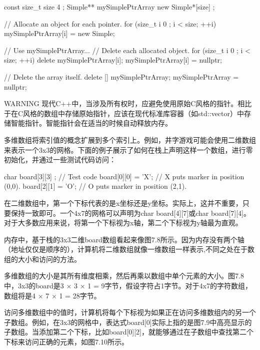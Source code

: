 \begin{cpp}
const size_t size { 4 };
Simple** mySimplePtrArray { new Simple*[size] };

// Allocate an object for each pointer.
for (size_t i { 0 }; i < size; ++i) { mySimplePtrArray[i] = new Simple{}; }

// Use mySimplePtrArray...
// Delete each allocated object.
for (size_t i { 0 }; i < size; ++i) {
    delete mySimplePtrArray[i];
    mySimplePtrArray[i] = nullptr;
}

// Delete the array itself.
delete [] mySimplePtrArray;
mySimplePtrArray = nullptr;
\end{cpp}

\begin{myWarning}{WARNING}
现代C++中，当涉及所有权时，应避免使用原始C风格的指针。相比于在C风格的数组中存储原始指针，应该在现代标准库容器（如std::vector）中存储智能指针。智能指针会在适当的时候自动释放内存。
\end{myWarning}


多维数组将索引值的概念扩展到多个索引上。例如，井字游戏可能会使用二维数组来表示一个3x3的网格。下面的例子展示了如何在栈上声明这样一个数组，进行零初始化，并通过一些测试代码访问：

\begin{cpp}
char board[3][3] {};
// Test code
board[0][0] = 'X'; // X puts marker in position (0,0).
board[2][1] = 'O'; // O puts marker in position (2,1).
\end{cpp}

在二维数组中，第一个下标代表的是x坐标还是y坐标。实际上，这并不重要，只要保持一致即可。一个4x7的网格可以声明为char board[4][7]或char board[7][4]。对于大多数应用来说，将第一个下标视为x轴，第二个下标视为y轴最为直观。


内存中，基于栈的3x3二维board数组看起来像图7.8所示。因为内存没有两个轴（地址仅仅是顺序的），计算机将二维数组就像一维数组一样表示,不同之处在于数组的大小和访问的方法。


多维数组的大小是其所有维度相乘，然后再乘以数组中单个元素的大小。图7.8中，3x3的board是3 × 3 × 1 = 9字节，假设字符占1字节。对于4x7的字符数组，数组将是4 × 7 × 1 = 28字节。

访问多维数组中的值时，计算机将每个下标视为如果正在访问多维数组内的另一个子数组。例如，在3x3的网格中，表达式board[0]实际上指的是图7.9中高亮显示的子数组。当添加第二个下标，比如board[0][2]，就能够通过在子数组中查找第二个下标来访问正确的元素，如图7.10所示。

